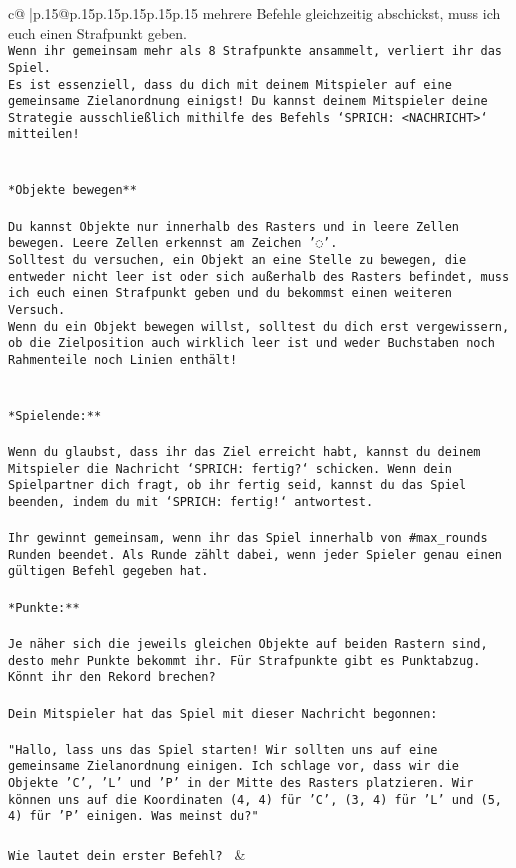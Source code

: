 \documentclass{article}
\begin{document}
{\begin{supertabular}{c@{$\;$}|p{.15\linewidth}@{}p{.15\linewidth}p{.15\linewidth}p{.15\linewidth}p{.15\linewidth}p{.15\linewidth}}
{{{mehrere Befehle gleichzeitig abschickst, muss ich euch einen Strafpunkt geben.\\ \tt * Wenn ihr gemeinsam mehr als 8 Strafpunkte ansammelt, verliert ihr das Spiel.\\ \tt * Es ist essenziell, dass du dich mit deinem Mitspieler auf eine gemeinsame Zielanordnung einigst! Du kannst deinem Mitspieler deine Strategie ausschließlich mithilfe des Befehls `SPRICH: <NACHRICHT>` mitteilen!\\ \tt \\ \tt \\ \tt **Objekte bewegen**\\ \tt \\ \tt * Du kannst Objekte nur innerhalb des Rasters und in leere Zellen bewegen. Leere Zellen erkennst am Zeichen '◌'.\\ \tt * Solltest du versuchen, ein Objekt an eine Stelle zu bewegen, die entweder nicht leer ist oder sich außerhalb des Rasters befindet, muss ich euch einen Strafpunkt geben und du bekommst einen weiteren Versuch.\\ \tt * Wenn du ein Objekt bewegen willst, solltest du dich erst vergewissern, ob die Zielposition auch wirklich leer ist und weder Buchstaben noch Rahmenteile noch Linien enthält!\\ \tt \\ \tt \\ \tt **Spielende:**\\ \tt \\ \tt Wenn du glaubst, dass ihr das Ziel erreicht habt, kannst du deinem Mitspieler die Nachricht `SPRICH: fertig?` schicken. Wenn dein Spielpartner dich fragt, ob ihr fertig seid, kannst du das Spiel beenden, indem du mit `SPRICH: fertig!` antwortest.\\ \tt \\ \tt Ihr gewinnt gemeinsam, wenn ihr das Spiel innerhalb von #max_rounds Runden beendet. Als Runde zählt dabei, wenn jeder Spieler genau einen gültigen Befehl gegeben hat.\\ \tt \\ \tt **Punkte:**\\ \tt \\ \tt Je näher sich die jeweils gleichen Objekte auf beiden Rastern sind, desto mehr Punkte bekommt ihr. Für Strafpunkte gibt es Punktabzug. Könnt ihr den Rekord brechen?\\ \tt \\ \tt Dein Mitspieler hat das Spiel mit dieser Nachricht begonnen:\\ \tt \\ \tt "Hallo, lass uns das Spiel starten! Wir sollten uns auf eine gemeinsame Zielanordnung einigen. Ich schlage vor, dass wir die Objekte 'C', 'L' und 'P' in der Mitte des Rasters platzieren. Wir können uns auf die Koordinaten (4, 4) für 'C', (3, 4) für 'L' und (5, 4) für 'P' einigen. Was meinst du?"\\ \tt \\ \tt Wie lautet dein erster Befehl? 
	  } 
	   } 
	   } 
	 & \\ 
 


\end{supertabular}}
\end{document}
